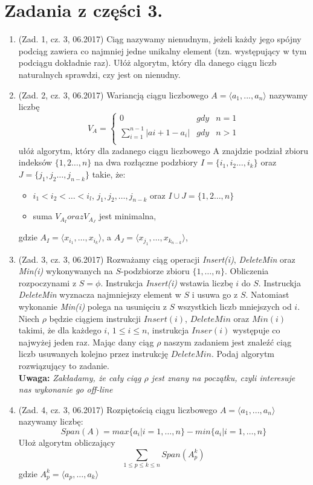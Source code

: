 \documentclass[10pt]{article}%
\begin{document}
\section{Zadania z części 3.}
\begin{enumerate}

\item (Zad. 1, cz. 3, 06.2017) Ciąg nazywamy nienudnym, jeżeli każdy jego spójny podciąg zawiera co najmniej jedne unikalny element (tzn. występujący w tym podciągu dokładnie raz). Ułóż algorytm, który dla danego ciągu liczb naturalnych sprawdzi, czy jest on nienudny.

\item (Zad. 2, cz. 3, 06.2017) Wariancją ciągu liczbowego $A = \langle a_1, ..., a_n \rangle $ nazywamy liczbę 
$$V_A = \left\{\begin{array}{rcl}
0&gdy&n=1\\
\sum_{i=1}^{n-1} |a{i+1}-a_i|&gdy&n>1\\
\end{array} \right.$$
ułóż algorytm, który dla zadanego ciągu liczbowego A znajdzie podział zbioru indeksów $\{1,2\ldots,n\}$ na dwa rozłączne podzbiory $I = \{i_1,i_2\ldots,i_k\}$ oraz $J = \{j_1,j_2\ldots,j_{n-k}\}$ takie, że:
\begin{itemize}
	\item $ i_1 < i_2 < \ldots < i_l$, $ j_1, j_2, \ldots, j_{n-k}$ oraz $I \cup J = \{1,2\ldots,n\}$
	\item suma $V_{A_I} oraz V_{A_J}$ jest minimalna, 
\end{itemize}
gdzie $A_I = \langle x_{i_1}, \ldots, x_{i_k} \rangle$, a $A_J = \langle x_{j_1}, \ldots, x_{k_{n-k}} \rangle$,  

\item (Zad. 3, cz. 3, 06.2017) Rozważamy ciąg operacji \textit{Insert(i)}, \textit{DeleteMin} oraz \textit{Min(i)} wykonywanych na $S$-podzbiorze zbioru $\{1,\ldots,n\}$. Obliczenia rozpoczynami z $S = \phi$. Instrukcja \textit{Insert(i)} wstawia liczbę $i$ do $S$. Instruckja \textit{DeleteMin} wyznacza najmniejszy element w $S$ i usuwa go z $S$. Natomiast wykonanie \textit{Min(i)} polega na usunięciu z $S$ wszystkich liczb mniejszych od $i$. \\
Niech $\rho$ będzie ciągiem instrukcji $Insert(i)$, $DeleteMin$ oraz $Min(i)$ takimi, że dla każdego $i$, $1\leq i \leq n$, instrukcja $Inser(i)$ występuje co najwyżej jeden raz. Mając dany ciąg $\rho$ naszym zadaniem jest znaleźć ciąg liczb usuwanych kolejno przez instrukcję $DeleteMin$. Podaj algorytm rozwiązujący to zadanie. \\
\textbf{Uwaga:} \textit{Zakładamy, że cały ciąg $\rho$ jest znany na początku, czyli interesuje nas wykonanie go off-line}

\item (Zad. 4, cz. 3, 06.2017) Rozpiętością ciągu liczbowego $A = \langle a_1, ..., a_n \rangle $ nazywamy liczbę:
$$Span(A) = max \{a_i | i = 1,\ldots,n\} - min\{a_i | i = 1,\ldots,n\}$$
Ułoż algorytm obliczający 
$$ \sum_{1 \leq p \leq k \leq n} Span(A_p^k)$$
gdzie $A_p^k = \langle a_p,\ldots,a_k \rangle$

\end{enumerate}
\end{document}
